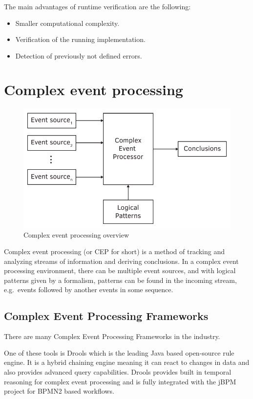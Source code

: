 The main advantages of runtime verification are the following:

\begin{itemize}
	\item Smaller computational complexity.
	\item Verification of the running implementation.
	\item Detection of previously not defined errors.
\end{itemize}

\section{Complex event processing}

\begin{figure}[h]
	\centering
	\includegraphics[width=0.6\linewidth]{figures/chapter_2/CEP}
	\caption{Complex event processing overview \redraw }
	\label{fig:intro:cep}
\end{figure}

Complex event processing (or CEP for short) is a method of tracking and analyzing streams of information and deriving conclusions. In a complex event processing environment, there can be multiple event sources, and with logical patterns given by a formalism, patterns can be found in the incoming stream, e.g.~events followed by another events in some sequence.

\subsection{Complex Event Processing Frameworks}
There are many Complex Event Processing Frameworks in the industry.

One of these tools is Drools\citep{drools} which is the leading Java based open-source rule engine. It is a hybrid chaining engine meaning it can react to changes in data and also provides advanced query capabilities. Drools provides built in temporal reasoning for complex event processing and is fully integrated with the jBPM project for BPMN2 based workflows.

